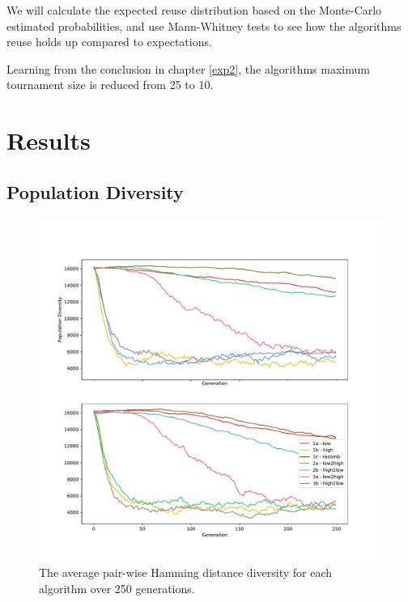 We will calculate the expected reuse distribution based on the Monte-Carlo estimated probabilities, and use Mann-Whitney tests to see how the algorithms reuse holds up compared to expectations. 

Learning from the conclusion in chapter \ref{exp2}, the algorithms maximum tournament size is reduced from 25 to 10.

\section{Results}

\subsection{Population Diversity}
\begin{figure}[h!]
    \includegraphics[width=\textwidth, center]{Chapters/4.Experiments/exp3/figures/diversity_hamming.pdf}
    \caption[Hamming diversity plot]{The average pair-wise Hamming distance diversity for each algorithm over 250 generations.}
    \label{fig:exp3.hamming}
\end{figure}
